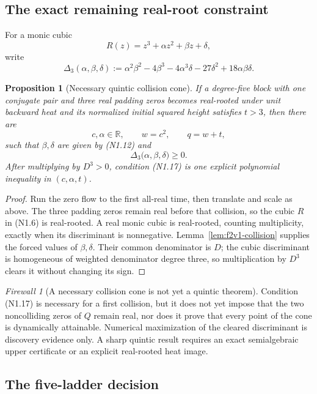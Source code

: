 \documentclass[11pt]{article}
\newtheorem{proposition}[theorem]{Proposition}
\theoremstyle{definition}
\theoremstyle{remark}
\newtheorem{firewall}[theorem]{Firewall}
\newcommand{\R}{\mathbb R}
\begin{document}
\subsection{The exact remaining real-root constraint}

For a monic cubic
\[
 R(z)=z^3+\alpha z^2+\beta z+\delta,
\]
write
\[
 \Delta_3(\alpha,\beta,\delta)
 :=
 \alpha^2\beta^2-4\beta^3-4\alpha^3\delta
 -27\delta^2+18\alpha\beta\delta.
\tag{N1.15}
\]

\begin{proposition}[Necessary quintic collision cone]
\label{prop:f2v1-cone}
If a degree-five block with one conjugate pair and three real padding
zeros becomes real-rooted under unit backward heat and its normalized
initial squared height satisfies \(t>3\), then there are
\[
 c,\alpha\in\R,\qquad w=c^2,\qquad q=w+t,
\tag{N1.16}
\]
such that \(\beta,\delta\) are given by \textup{(N1.12)} and
\[
 \boxed{
 \Delta_3\bigl(\alpha,\beta,\delta\bigr)\ge0.}
\tag{N1.17}
\]
After multiplying by \(D^3>0\), condition \textup{(N1.17)} is one
explicit polynomial inequality in \((c,\alpha,t)\).
\end{proposition}

\begin{proof}
Run the zero flow to the first all-real time, then translate and scale as
above.  The three padding zeros remain real before that collision, so the
cubic \(R\) in \textup{(N1.6)} is real-rooted.  A real monic cubic is
real-rooted, counting multiplicity, exactly when its discriminant is
nonnegative.  Lemma~\ref{lem:f2v1-collision} supplies the forced values of
\(\beta,\delta\).  Their common denominator is \(D\); the cubic
discriminant is homogeneous of weighted denominator degree three, so
multiplication by \(D^3\) clears it without changing its sign.
\end{proof}

\begin{firewall}[A necessary collision cone is not yet a quintic theorem]
Condition \textup{(N1.17)} is necessary for a first collision, but it does
not yet impose that the two noncolliding zeros of \(Q\) remain real, nor
does it prove that every point of the cone is dynamically attainable.
Numerical maximization of the cleared discriminant is discovery evidence
only.  A sharp quintic result requires an exact semialgebraic upper
certificate or an explicit real-rooted heat image.
\end{firewall}

\subsection{The five-ladder decision}
\end{document}
